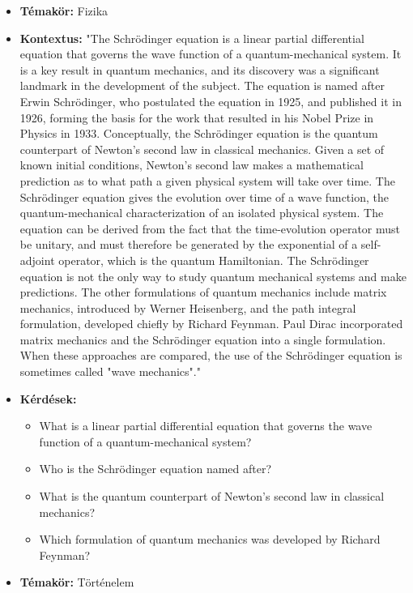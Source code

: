 \begin{itemize}
\item \textbf{Témakör:} Fizika
\item \textbf{Kontextus:} "The Schrödinger equation is a linear partial differential equation that governs the wave function of a quantum-mechanical system. It is a key result in quantum mechanics, and its discovery was a significant landmark in the development of the subject. The equation is named after Erwin Schrödinger, who postulated the equation in 1925, and published it in 1926, forming the basis for the work that resulted in his Nobel Prize in Physics in 1933.
Conceptually, the Schrödinger equation is the quantum counterpart of Newton's second law in classical mechanics. Given a set of known initial conditions, Newton's second law makes a mathematical prediction as to what path a given physical system will take over time. The Schrödinger equation gives the evolution over time of a wave function, the quantum-mechanical characterization of an isolated physical system. The equation can be derived from the fact that the time-evolution operator must be unitary, and must therefore be generated by the exponential of a self-adjoint operator, which is the quantum Hamiltonian.
The Schrödinger equation is not the only way to study quantum mechanical systems and make predictions. The other formulations of quantum mechanics include matrix mechanics, introduced by Werner Heisenberg, and the path integral formulation, developed chiefly by Richard Feynman. Paul Dirac incorporated matrix mechanics and the Schrödinger equation into a single formulation. When these approaches are compared, the use of the Schrödinger equation is sometimes called "wave mechanics"."
\item \textbf{Kérdések:} 
	\begin{itemize}
		\item What is a linear partial differential equation that governs the wave function of a quantum-mechanical system?
		\item Who is the Schrödinger equation named after?
		\item What is the quantum counterpart of Newton's second law in classical mechanics?
		\item Which formulation of quantum mechanics was developed by Richard Feynman?
	\end{itemize}
\item \textbf{Témakör:} Történelem

\end{itemize}

